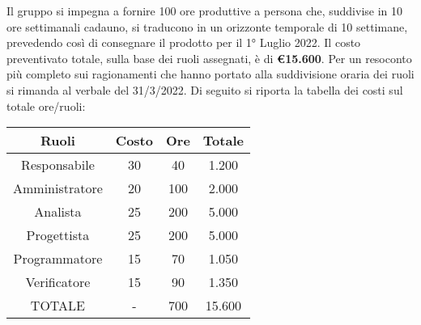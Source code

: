 Il gruppo \textit{\teamname} si impegna a fornire 100 ore produttive a persona che, suddivise in 10 ore settimanali cadauno, si traducono in un orizzonte temporale di 10 settimane, prevedendo così di consegnare il prodotto per il 1° Luglio 2022. \newline
Il costo preventivato totale, sulla base dei ruoli assegnati, è di \textbf{\euro{15.600}}. \newline
Per un resoconto più completo sui ragionamenti che hanno portato alla suddivisione oraria dei ruoli si rimanda al verbale del 31/3/2022. \newline
Di seguito si riporta la tabella dei costi sul totale ore/ruoli:
\begin{table}
	\begin{center}
		\setlength{\extrarowheight}{.75ex}
		\begin{tabular}{ | c | c | c | c | }
			\hline 	
			\textbf{Ruoli} & \textbf{Costo} & \textbf{Ore} & \textbf{Totale}\\
			\hline 			
			
			Responsabile{} & 30{} & 40{} & 1.200{} \\
			Amministratore{} & 20{} & 100{} & 2.000{} \\
			Analista{} & 25{} & 200{} & 5.000{} \\
			Progettista{} & 25{} & 200{} & 5.000{}  \\
			Programmatore{} & 15{} & 70{} & 1.050{}  \\
			Verificatore{} & 15{} & 90{} & 1.350{}  \\
			TOTALE{} & -{} & 700{} & 15.600{}  \\	
			
			\hline 
		\end{tabular}
	\end{center}
\end{table}